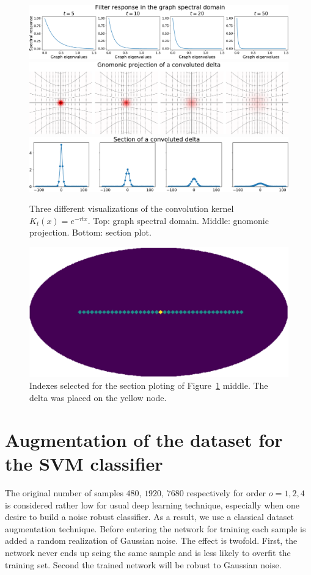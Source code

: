 \documentclass[final,twocolumn,3p,times,authoryear]{elsarticle}
\newcommand{\figref}[1]{Figure~\ref{fig:#1}}
\newcommand{\1}{\b{1}}              %
\newcommand{\0}{\b{0}}              %
\begin{document}
\begin{figure}[!ht]
\centering
\includegraphics[width=\linewidth]{gaussian_filters_spectral}
\includegraphics[width=\linewidth]{gaussian_filters_gnomonic}
\includegraphics[width=\linewidth]{gaussian_filters_section}
\caption{Three different visualizations of the convolution kernel $K_t(x)=e^{-\tau t x}$.
Top: graph spectral domain.
Middle: gnomonic projection.
Bottom: section plot.}
\label{fig:gaussian_filters_visualization}
\end{figure}

\begin{figure}[!ht]
\centering
\includegraphics[width=0.6\linewidth]{index_plotting_order20_nside16}
\caption{Indexes selected for the section ploting of \figref{gaussian_filters_visualization} middle. The delta was placed on the yellow node.}
\label{fig:index_section}
\end{figure}

\section{Augmentation of the dataset for the SVM classifier}
\label{sec:dataset_augmentation} The original number of samples $480$, $1920$,
$7680$ respectively for order $o=1,2,4$ is considered rather low for usual
deep learning technique, especially when one desire to build a noise robust
classifier. As a result, we use a classical dataset augmentation technique.
Before entering the network for training each sample is added a random
realization of Gaussian noise. The effect is twofold. First, the network never
ends up seing the same sample and is less likely to overfit the training set.
Second the trained network will be robust to Gaussian noise.
\end{document}

